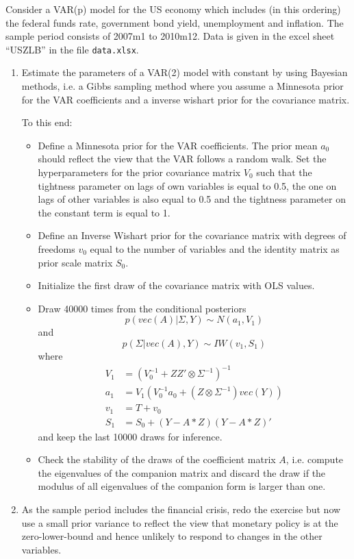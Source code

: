 Consider a VAR(p) model for the US economy which includes (in this ordering) the federal funds rate, government bond yield, unemployment and inflation. The sample period consists of 2007m1 to 2010m12. Data is given in the excel sheet \enquote{USZLB} in the file \texttt{data.xlsx}.

\begin{enumerate}
    \item Estimate the parameters of a VAR(2) model with constant by using Bayesian methods, i.e. a Gibbs sampling method where you assume a Minnesota prior for the VAR coefficients and a inverse wishart prior for the covariance matrix.

          To this end:
          \begin{itemize}
              \item Define a Minnesota prior for the VAR coefficients. The prior mean $a_0$ should reflect the view that the VAR follows a random walk. Set the hyperparameters for the prior covariance matrix $V_0$ such that the tightness parameter on lags of own variables is equal to 0.5, the one on lags of other variables is also equal to 0.5 and the tightness parameter on the constant term is equal to 1.

              \item Define an Inverse Wishart prior for the covariance matrix with degrees of freedoms $v_0$ equal to the number of variables and the identity matrix as prior scale matrix $S_0$.

              \item Initialize the first draw of the covariance matrix with OLS values.

              \item Draw 40000 times from the conditional posteriors $$p(vec(A)|\Sigma,Y) \sim N(a_1,V_1)$$ and $$p(\Sigma|vec(A),Y) \sim IW(v_1, S_1)$$ where
                    \begin{align*}
                        V_1 & = (V_0^{-1}+ZZ' \otimes \Sigma^{-1})^{-1}           \\
                        a_1 & = V_1 (V_0^{-1}a_0 + (Z \otimes \Sigma^{-1})vec(Y)) \\
                        v_1 & = T + v_0                                           \\
                        S_1 & = S_0 + (Y - A*Z)(Y - A*Z)'
                    \end{align*}
                    and keep the last 10000 draws for inference.

              \item Check the stability of the draws of the coefficient matrix $A$, i.e. compute the eigenvalues of the companion matrix and discard the draw if the modulus of all eigenvalues of the companion form is larger than one.

          \end{itemize}

    \item As the sample period includes the financial crisis, redo the exercise but now use a small prior variance to reflect the view that monetary policy is at the zero-lower-bound and hence unlikely to respond to changes in the other variables.
\end{enumerate}